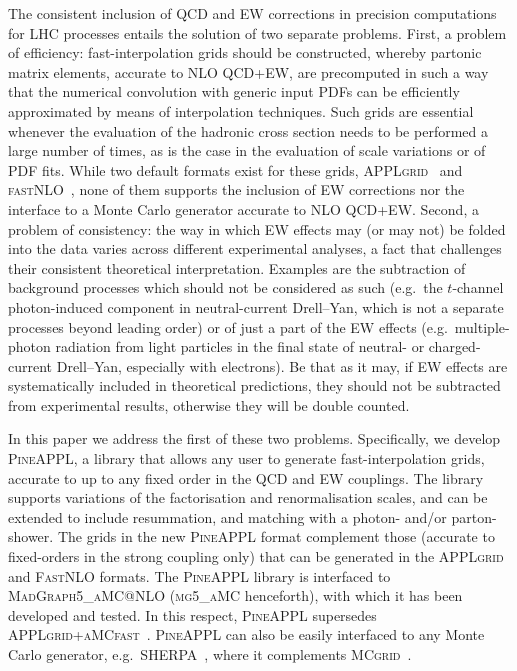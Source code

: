 The consistent inclusion of QCD and EW corrections in precision computations for
LHC processes entails
the solution of two separate problems. First, a problem of efficiency:
fast-interpolation grids should be constructed, whereby partonic matrix 
elements, accurate to NLO QCD+EW, are precomputed in such a way that the 
numerical convolution with generic input PDFs can be efficiently approximated
by means of interpolation techniques. Such grids are essential
whenever the evaluation of the hadronic cross section needs to 
be performed a large number of times, as is the case in the evaluation of
scale variations or of PDF fits. While two default formats exist for
these grids, \textsc{APPLgrid}~\cite{Carli:2010rw} and
\textsc{fastNLO}~\cite{Kluge:2006xs,Wobisch:2011ij,Britzger:2012bs}, none of them supports the inclusion of EW
corrections nor the interface to a Monte Carlo generator accurate to 
NLO QCD+EW\@. Second, a problem of consistency: the way in which EW effects may
(or may not) be folded into the data varies across different experimental 
analyses, a fact that challenges their consistent theoretical interpretation. 
Examples are the subtraction of background processes which should not be 
considered as such (e.g.\ the $t$-channel photon-induced component in
neutral-current Drell--Yan, which is not a separate processes beyond leading
order) or of just a part of the EW effects (e.g.\ multiple-photon
radiation from light particles in the final state of neutral- or charged-current
Drell--Yan, especially with electrons). Be that as it may, if EW effects are
systematically included in theoretical predictions, they should not be subtracted
from experimental results, otherwise they will be double counted.

In this paper we address the first of these two problems. Specifically, 
we develop \textsc{PineAPPL}, a library that allows any user to generate
fast-interpolation grids, accurate to up to any fixed order in the QCD and
EW couplings. The library supports variations of the factorisation
and renormalisation scales, and can be extended to include
resummation, and matching with a photon- and/or parton-shower.
The grids in the new \textsc{PineAPPL} format complement those
(accurate to fixed-orders in the strong coupling only) that can be generated 
in the \textsc{APPLgrid} and \textsc{FastNLO} formats. The \textsc{PineAPPL}
library is interfaced to \textsc{MadGraph5\_aMC@NLO} (\textsc{mg5\_aMC}
henceforth), with which it has been developed and tested. In this respect,
\textsc{PineAPPL} supersedes
\textsc{APPLgrid}+\textsc{aMCfast}~\cite{Bertone:2014zva}.
\textsc{PineAPPL} can also be easily interfaced to any Monte Carlo generator,
e.g.\ \textsc{SHERPA}~\cite{Biedermann:2017yoi}, where it complements
\textsc{MCgrid}~\cite{DelDebbio:2013kxa,Bothmann:2015dba}.

